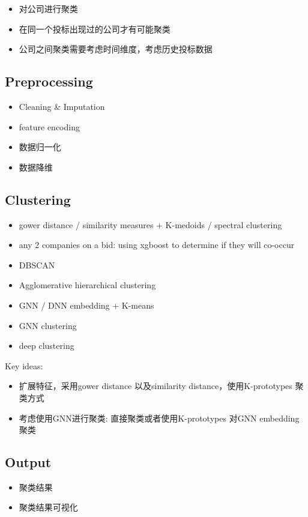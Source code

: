 \documentclass[runningheads]{llncs}
\begin{document}
\begin{itemize}
    \item 对公司进行聚类
    \item 在同一个投标出现过的公司才有可能聚类
    \item 公司之间聚类需要考虑时间维度，考虑历史投标数据
\end{itemize}

\subsection{Preprocessing}
\begin{itemize}
    \item Cleaning \& Imputation
    \item feature encoding
    \item 数据归一化
    \item 数据降维
\end{itemize}

\subsection{Clustering}
\begin{itemize}
    \item gower distance / similarity measures + K-medoids / spectral clustering
    \item any 2 companies on a bid: using xgboost to determine if they will co-occur
    \item DBSCAN
    \item Agglomerative hierarchical clustering
    \item GNN / DNN embedding + K-means
    \item GNN clustering
    \item deep clustering
\end{itemize}

Key ideas:
\begin{itemize}
    \item 扩展特征，采用gower distance 以及similarity distance，使用K-prototypes 聚类方式
    \item 考虑使用GNN进行聚类: 直接聚类或者使用K-prototypes 对GNN embedding 聚类
\end{itemize}

\subsection{Output}
\begin{itemize}
    \item 聚类结果
    \item 聚类结果可视化
\end{itemize}
\end{document}
